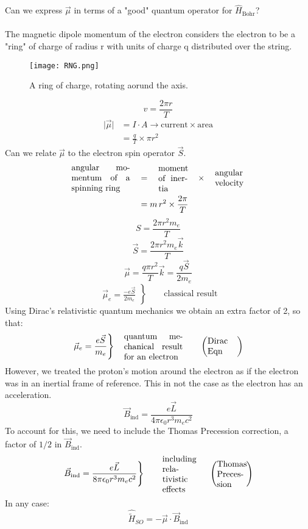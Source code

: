\documentclass[12pt,fancychapters]{report}
\numberwithin{equation}{section}
\begin{document}
Can we express $\vec{\mu}$ in terms of a "good" quantum operator for $\hat{H}_\text{Bohr}$?\\
\\
The magnetic dipole momentum of the electron considers the electron to be a "ring" 
of charge of radius r with units of charge q distributed over the string.
\begin{figure}[H]
  \centering
	\texttt{[image: RNG.png]}
  \caption{A ring of charge, rotating aorund the axis.}
\end{figure}
$$
v = \frac{2\pi r}{T}
$$
\begin{align*}
  \big|\vec{\mu}\big| &= I\cdot A \longrightarrow \text{current}\times\text{area}\\
                      &= \frac{q}{T} \times \pi r^2
\end{align*}
Can we relate $\vec{\mu}$ to the electron spin operator $\vec{S}$.
\begin{align*}
  \parbox{0.2\textwidth}{angular momentum of a spinning ring} 
  \quad &= \quad \parbox{0.1\textwidth}{moment of inertia} \quad \times \quad
  \parbox{0.1\textwidth}{angular velocity}\\
        &= m\,r^2 \times \frac{2\pi}{T}
\end{align*}
\[
  S  = \frac{2\pi r^2m_e}{T}
\]
\[
  \vec{S} = \frac{2\pi r^2 m_e \vec{k}}{T}
\]
\[
  \vec{\mu} = \frac{q \pi r^2}{T}\vec{k} = \frac{q\vec{S}}{2m_e}
\]
\[
  \left.\begin{aligned}
        \vec{\mu}_e = \frac{-e\vec{S}}{2m_e}
       \end{aligned}
 \right\}
 \qquad \text{classical result}
\]
Using Dirac's relativistic quantum mechanics we obtain an extra factor of 2, so that:
\[
  \left.
  \vec{\mu}_e = \frac{e \vec{S}}{m_e}
\right\} \quad
\parbox{0.2\textwidth}{quantum mechanical result for an electron}
\qquad \left(\parbox{0.1\textwidth}{Dirac Eqn} \right)
\]
However, we treated the proton's motion around the electron as if the electron was in an inertial
frame of reference.
This in not the case as the electron has an acceleration.
\[
  \vec{B}_\text{ind} = \frac{e \vec{L}}{4\pi \epsilon_0 r^3 m_e c^2}
\]
To account for this, we need to include the Thomas Precession correction, a factor of $1/2$ in
$\vec{B}_\text{ind}$.
\[
  \left.
  \vec{B}_\text{ind} = \frac{e\vec{L}}{8\pi \epsilon_0 r^3 m_e c^2}
\right\}
\qquad \parbox{0.1\textwidth}{including relativistic effects}
\qquad \left(\parbox{0.1\textwidth}{Thomas Precession} \right)
\]
In any case: 
\[
  \hat{\tilde{H}}_{SO} = -\vec{\mu}\cdot \vec{B}_\text{ind}
\]
\end{document}
